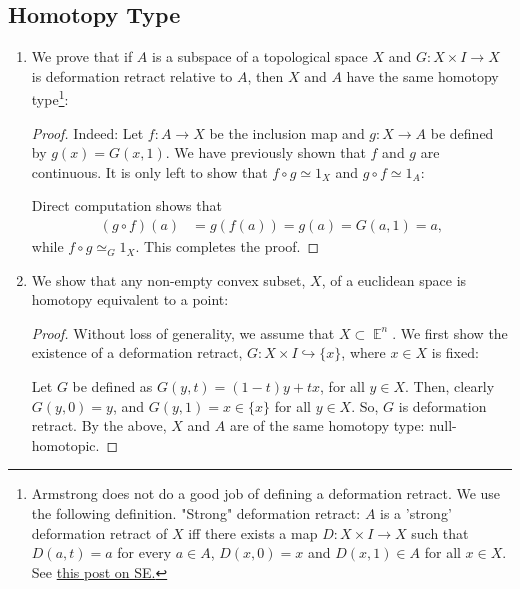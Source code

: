\documentclass{book}
\DeclareMathOperator*{\E}{\mathbb{E}}
\begin{document}
\subsection{Homotopy Type}
\begin{enumerate}[(1)]

    \item We prove that if $A$ is a subspace of a topological space $X$ and  $G: X \times I \rightarrow X$ is deformation retract relative to $A$, then $X$ and $A$ have the same homotopy type\footnote{Armstrong does not do a good job of defining a deformation retract. We use the following definition. "Strong" deformation retract: $A$ is a 'strong' deformation retract of $X$ iff there exists a map $D:X \times I \rightarrow X$ such that $D(a,t)=a$ for every $a \in A$, $D(x,0)=x$ and $D(x,1) \in A$ for all $x \in X$. See \href{http://math.stackexchange.com/questions/488527/deformation-retract-and-homotopy-equivalence}{this post on SE.}}: 
        \begin{proof} Indeed: Let $f:A \rightarrow X$ be the inclusion map and $g: X \rightarrow A$ be defined by $g(x) = G(x,1)$. We have previously shown that $f$ and $g$ are continuous. It is only left to show that $f \circ g \simeq 1_X$ and $g \circ f \simeq 1_A$:
            \par Direct computation shows that 
            \begin{align*}
                (g \circ f)(a) & = g(f(a)) = g(a) = G(a,1) = a,
            \end{align*}
            while $f \circ g \simeq_G 1_X$. This completes the proof.
        \end{proof}

    \item We show that any non-empty convex subset, $X$, of a euclidean space is homotopy equivalent to a point: 
        \begin{proof} 
            Without loss of generality, we assume that $X \subset \E^n$. We first show the existence of a deformation retract, $G: X \times I \hookrightarrow \{x\}$, where $x \in X$ is fixed:
            \par Let $G$ be defined as $G(y,t) = (1-t)y + tx$, for all $y \in X$. Then, clearly $G(y,0) = y$, and $G(y,1) = x \in \{x\}$ for all $y \in X$. So, $G$ is deformation retract. By the above, $X$ and $A$ are of the same homotopy type: null-homotopic. 
        \end{proof}


\end{enumerate}
\end{document}
